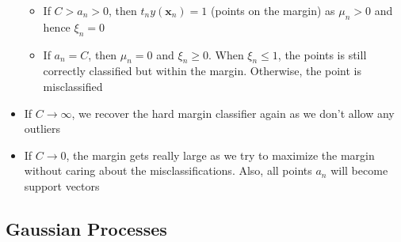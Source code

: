 \begin{itemize}
\begin{itemize}
		\item If $C > a_n > 0$, then $t_n y(\bm{x}_n) = 1$ (points on the margin) as $\mu_n > 0$ and hence $\xi_n = 0$
		\item If $a_n = C$, then $\mu_n = 0$ and $\xi_n \geq 0$. When $\xi_n \leq 1$, the points is still correctly classified but within the margin. Otherwise, the point is misclassified
	\end{itemize}
	\item If $C\to\infty$, we recover the hard margin classifier again as we don't allow any outliers
	\item If $C\to 0$, the margin gets really large as we try to maximize the margin without caring about the misclassifications. Also, all points $a_n$ will become support vectors 
\end{itemize}
\subsection{Gaussian Processes}
